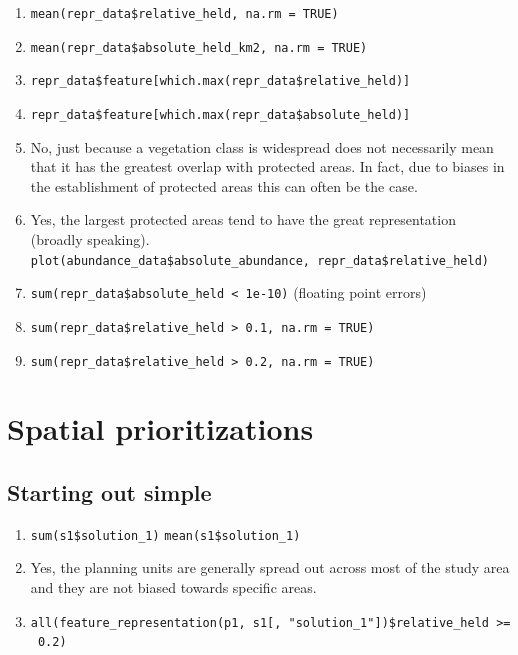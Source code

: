 \documentclass[
  12pt,
]{book}
\makeatletter
\providecommand{\tightlist}{%
  \setlength{\itemsep}{0pt}\setlength{\parskip}{0pt}}
\newenvironment{kframe}{%
\medskip{}
\setlength{\fboxsep}{.8em}
 \def\at@end@of@kframe{}%
 \ifinner\ifhmode%
  \def\at@end@of@kframe{\end{minipage}}%
  \begin{minipage}{\columnwidth}%
 \fi\fi%
 \def\FrameCommand##1{\hskip\@totalleftmargin \hskip-\fboxsep
 \colorbox{shadecolor}{##1}\hskip-\fboxsep
     \hskip-\linewidth \hskip-\@totalleftmargin \hskip\columnwidth}%
 \MakeFramed {\advance\hsize-\width
   \@totalleftmargin\z@ \linewidth\hsize
   \@setminipage}}%
 {\par\unskip\endMakeFramed%
 \at@end@of@kframe}
\newenvironment{rmdblock}[1]
  {
  \begin{itemize}
  \renewcommand{\labelitemi}{
    \raisebox{-.7\height}[0pt][0pt]{
      {\setkeys{Gin}{width=3em,keepaspectratio}\texttt{[image: images/\#1]}}
    }
  }
  \setlength{\fboxsep}{1em}
  \begin{kframe}
  \item
  }
  {
  \end{kframe}
  \end{itemize}
  }
\newenvironment{rmdanswer}
  {\begin{rmdblock}{answer}}
  {\end{rmdblock}}
\makeatother
\begin{document}
\begin{rmdanswer}
\begin{enumerate}
\def\labelenumi{\arabic{enumi}.}
\tightlist
\item
  \texttt{mean(repr\_data\$relative\_held,\ na.rm\ =\ TRUE)}
\item
  \texttt{mean(repr\_data\$absolute\_held\_km2,\ na.rm\ =\ TRUE)}
\item
  \texttt{repr\_data\$feature{[}which.max(repr\_data\$relative\_held){]}}
\item
  \texttt{repr\_data\$feature{[}which.max(repr\_data\$absolute\_held){]}}
\item
  No, just because a vegetation class is widespread does not necessarily mean that it has the greatest overlap with protected areas. In fact, due to biases in the establishment of protected areas this can often be the case.
\item
  Yes, the largest protected areas tend to have the great representation (broadly speaking). \newline
  \texttt{plot(abundance\_data\$absolute\_abundance,\ repr\_data\$relative\_held)}
\item
  \texttt{sum(repr\_data\$absolute\_held\ \textless{}\ 1e-10)} (floating point errors)
\item
  \texttt{sum(repr\_data\$relative\_held\ \textgreater{}\ 0.1,\ na.rm\ =\ TRUE)}
\item
  \texttt{sum(repr\_data\$relative\_held\ \textgreater{}\ 0.2,\ na.rm\ =\ TRUE)}
\end{enumerate}
\end{rmdanswer}

\hypertarget{spatial-prioritizations-1}{%
\section{Spatial prioritizations}\label{spatial-prioritizations-1}}

\hypertarget{starting-out-simple-1}{%
\subsection{Starting out simple}\label{starting-out-simple-1}}

\begin{rmdanswer}
\begin{enumerate}
\def\labelenumi{\arabic{enumi}.}
\tightlist
\item
  \texttt{sum(s1\$solution\_1)} \newline
  \texttt{mean(s1\$solution\_1)}
\item
  Yes, the planning units are generally spread out across most of the study area and they are not biased towards specific areas.
\item
  \texttt{all(feature\_representation(p1,\ s1{[},\ "solution\_1"{]})\$relative\_held\ \textgreater{}=\ 0.2)}
\end{enumerate}
\end{rmdanswer}
\end{document}
